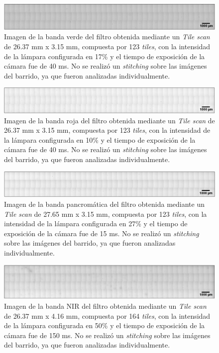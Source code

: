 \begin{figure}[H]
	\centering
	\includegraphics[width=1.0\textwidth]{Figs/cuantificaciondefectos/banda_VERDE.png}
	\caption{Imagen de la banda verde del filtro obtenida mediante un \textit{Tile scan} de 26.37 mm x 3.15 mm, compuesta por 123 \textit{tiles}, con la intensidad de la lámpara configurada en 17\% y el tiempo de exposición de la cámara fue de 40 ms. No se realizó un \textit{stitching} sobre las imágenes del barrido, ya que fueron analizadas individualmente.}
	\label{fig:tilebandaverde}
\end{figure}
\begin{figure}[H]
	\centering
	\includegraphics[width=1.0\textwidth]{Figs/cuantificaciondefectos/banda_PANC.png}
	\caption{Imagen de la banda roja del filtro obtenida mediante un \textit{Tile scan} de 26.37 mm x 3.15 mm, compuesta por 123 \textit{tiles}, con la intensidad de la lámpara configurada en 10\% y el tiempo de exposición de la cámara fue de 40 ms. No se realizó un \textit{stitching} sobre las imágenes del barrido, ya que fueron analizadas individualmente.}
	\label{fig:tilebandapanc}
\end{figure}
\begin{figure}[H]
	\centering
	\includegraphics[width=1.0\textwidth]{Figs/defectosZEISS/tilebandaroja.png}
	\caption{Imagen de la banda pancromática del filtro obtenida mediante un \textit{Tile scan} de 27.65 mm x 3.15 mm, compuesta por 123 \textit{tiles}, con la intensidad de la lámpara configurada en 27\% y el tiempo de exposición de la cámara fue de 15 ms. No se realizó un \textit{stitching} sobre las imágenes del barrido, ya que fueron analizadas individualmente.}
	\label{fig:tilebandaroja}
\end{figure}

\begin{figure}[H]
	\centering
	\includegraphics[width=1.0\textwidth]{Figs/cuantificaciondefectos/banda_NIR.png}
	\caption{Imagen de la banda NIR del filtro obtenida mediante un \textit{Tile scan} de 26.37 mm x 4.16 mm, compuesta por 164 \textit{tiles}, con la intensidad de la lámpara configurada en 50\% y el tiempo de exposición de la cámara fue de 150 ms. No se realizó un \textit{stitching} sobre las imágenes del barrido, ya que fueron analizadas individualmente.}
	\label{fig:tilebandanir}
\end{figure}

